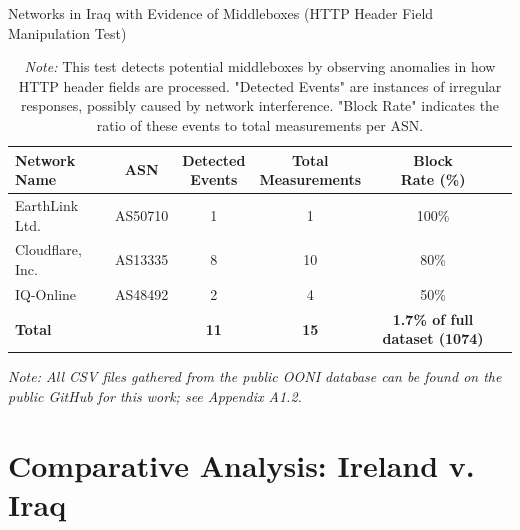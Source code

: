 \vspace{2em}

\begin{table}[H]
\centering
\caption{Networks in Iraq with Evidence of Middleboxes (HTTP Header Field Manipulation Test)}
\begin{tabular}{lccccc}
\toprule
\textbf{Network Name} & \textbf{ASN} & \shortstack{\textbf{Detected} \\ \textbf{Events}} & \shortstack{\textbf{Total} \\ \textbf{Measurements}} & \shortstack{\textbf{Block} \\ \textbf{Rate (\%)}} \\
\midrule
EarthLink Ltd.        & AS50710  & 1 & 1  & 100\%  \\
Cloudflare, Inc.      & AS13335  & 8 & 10 & 80\%   \\
IQ-Online             & AS48492  & 2 & 4  & 50\%   \\
\bottomrule
\textbf{Total} & & \textbf{11} & \textbf{15} & \textbf{1.7\% of full dataset (1074)} \\
\end{tabular}

\vspace{1em}

\begin{minipage}{0.95\linewidth}
\caption*{\textit{Note:} This test detects potential middleboxes by observing anomalies in how HTTP header fields are processed. "Detected Events" are instances of irregular responses, possibly caused by network interference. "Block Rate" indicates the ratio of these events to total measurements per ASN.}
\end{minipage}
\label{tab:middlebox_http_header}
\end{table}


\textit{Note: All CSV files gathered from the public OONI database can be found on the public GitHub for this work; see Appendix A1.2.}


\section{Comparative Analysis: Ireland v. Iraq}

